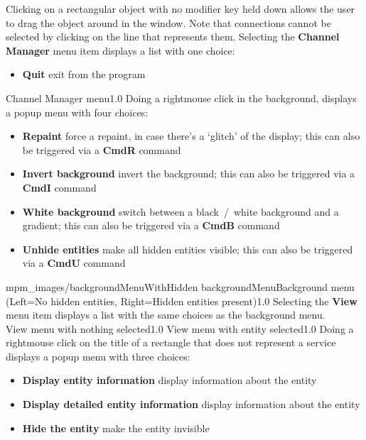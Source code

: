 Clicking on a rectangular object with no modifier key held down allows the user to drag
the object around in the window.
Note that connections cannot be selected by clicking on the line that represents them.
\clearpage
Selecting the \textbf{Channel Manager} menu item displays a list with one choice:
\begin{itemize}
\item\textbf{Quit} exit from the program
\end{itemize}
%
{Channel Manager menu}{1.0}
\clearpage
Doing a right\longDash{}mouse click in the background, displays a popup menu with four
choices:
\begin{itemize}
\item\textbf{Repaint} force a repaint, in case there's a `glitch' of the display; this
can also be triggered via a \textbf{Cmd\longDash{}R} command
\item\exSp\textbf{Invert background} invert the background; this can also be triggered via
a \textbf{Cmd\longDash{}I} command
\item\exSp\textbf{White background} switch between a black~/~white background and a
gradient; this can also be triggered via a \textbf{Cmd\longDash{}B} command
\item\exSp\textbf{Unhide entities} make all hidden entities visible; this can also be
triggered via a \textbf{Cmd\longDash{}U} command
\end{itemize}
%
{mpm_images/backgroundMenuWithHidden}%
{backgroundMenu}{Background menu (Left=No hidden entities, Right=Hidden
entities present)}{1.0}
\clearpage
Selecting the \textbf{View} menu item displays a list with the same choices as the
background menu.\\
%
{View menu with nothing selected}{1.0}
%
{View menu with entity selected}{1.0}
\clearpage
Doing a right\longDash{}mouse click on the title of a rectangle that does not represent a
service displays a popup menu with three choices:
\begin{itemize}
\item\textbf{Display entity information} display information about the entity
\item\exSp\textbf{Display detailed entity information} display information about the
entity
\item\exSp\textbf{Hide the entity} make the entity invisible
\end{itemize}
